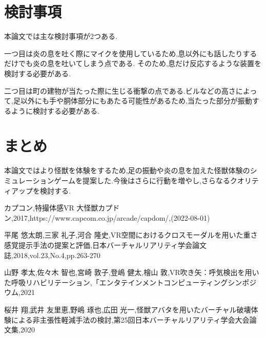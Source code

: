 \documentclass[uplatex]{jsarticle}   %
\begin{document}
\section{検討事項}
本論文では主な検討事項が2つある.

一つ目は炎の息を吐く際にマイクを使用しているため,息以外にも話したりするだけでも炎の息を吐いてしまう点である.
そのため,息だけ反応するような装置を検討する必要がある.

二つ目は町の建物が当たった際に生じる衝撃の点である.ビルなどの高さによって,足以外にも手や胴体部分にもあたる可能性があるため,当たった部分が振動するように検討する必要がある.

\section{まとめ}
本論文ではより怪獣を体験をするため,足の振動や炎の息を加えた怪獣体験のシミュレーションゲームを提案した.今後はさらに行動を増やし,さらなるクオリティアップを検討する.



\begin{thebibliography}{99}
    \item カプコン,特撮体感VR 大怪獣カプドン,2017,https://www.capcom.co.jp/arcade/capdom/,(2022-08-01)
    
    \item 平尾 悠太朗,三家 礼子,河合 隆史,VR空間におけるクロスモーダルを用いた重さ感覚提示手法の提案と評価,日本バーチャルリアリティ学会論文誌,2018,vol.23,No.4,pp.263-270
    
    \item 山野 孝太,佐々木 智也,宮崎 敦子,登嶋 健太,檜山 敦,VR吹き矢：呼気検出を用いた呼吸リハビリテーション,「エンタテインメントコンピューティングシンポジウム,2021
    
    \item 桜井 翔,武井 友里恵,野嶋 琢也,広田 光一,怪獣アバタを用いたバーチャル破壊体験による非主張性軽減手法の検討,第25回日本バーチャルリアリティ学会大会論文集,2020
    
\end{thebibliography}
\end{document}
